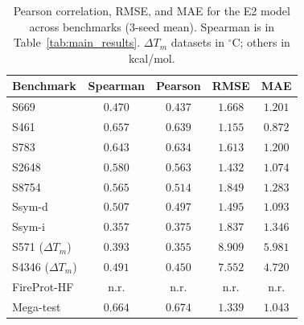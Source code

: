\begin{table}[t]\centering\footnotesize\setlength{\tabcolsep}{4pt}
\caption{Pearson correlation, RMSE, and MAE for the E2 model across benchmarks (3-seed mean). Spearman is in Table~\ref{tab:main_results}. $\Delta T_m$ datasets in $^\circ$C; others in kcal/mol.}
\label{tab:metrics_full}
\begin{tabular}{lcccc}
\toprule
Benchmark & Spearman & Pearson & RMSE & MAE \\
\midrule
S669 & $0.470$ & $0.437$ & $1.668$ & $1.201$ \\
S461 & $0.657$ & $0.639$ & $1.155$ & $0.872$ \\
S783 & $0.643$ & $0.634$ & $1.613$ & $1.200$ \\
S2648 & $0.580$ & $0.563$ & $1.432$ & $1.074$ \\
S8754 & $0.565$ & $0.514$ & $1.849$ & $1.283$ \\
Ssym-d & $0.507$ & $0.497$ & $1.495$ & $1.093$ \\
Ssym-i & $0.357$ & $0.375$ & $1.837$ & $1.346$ \\
S571 ($\Delta T_m$) & $0.393$ & $0.355$ & $8.909$ & $5.981$ \\
S4346 ($\Delta T_m$) & $0.491$ & $0.450$ & $7.552$ & $4.720$ \\
FireProt-HF & n.r. & n.r. & n.r. & n.r. \\
Mega-test & $0.664$ & $0.674$ & $1.339$ & $1.043$ \\
\bottomrule
\end{tabular}
\end{table}
